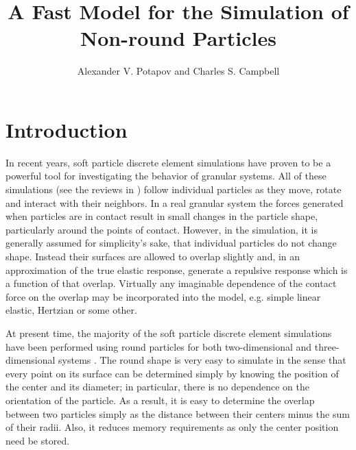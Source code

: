 \documentclass[granma]{svjour}
\begin{document}
\title{A Fast Model for the Simulation of Non-round Particles}
\author{Alexander V. Potapov and Charles S. Campbell}
\date{}
\maketitle


\section{Introduction}

In recent years, soft particle discrete element simulations have pro\-ven to be
a powerful tool for investigating the behavior of granular systems. All of
these simulations (see the reviews in \cite{camp86,camp97}) follow individual
particles as they move, rotate and interact with their neighbors. In a real
granular system the forces generated when particles are in contact result in
small changes in the particle shape, particularly around the points of
contact. However, in the simulation, it is generally assumed for simplicity's
sake, that individual particles do not change shape. Instead their surfaces
are allowed to overlap slightly and, in an approximation of the true elastic
response, generate a repulsive response which is a function of that overlap.
Virtually any imaginable dependence of the contact force on the overlap may
be incorporated into the model, e.g. simple linear elastic, Hertzian or some
other.

At present time, the majority of the soft particle discrete element
simulations have been performed using round particles for both
two-dimensional and three-dimensional systems \cite{camp86,camp97}. The
round
shape is very easy to simulate in the sense that every point on its surface
can be determined simply by knowing the position of the center and its
diameter; in particular, there is no dependence on the orientation of the
particle. As a result, it is easy to determine the overlap between two
particles simply as the distance between their centers minus the sum of their
radii. Also, it reduces memory requirements as only the center position need
be stored.
\end{document}
